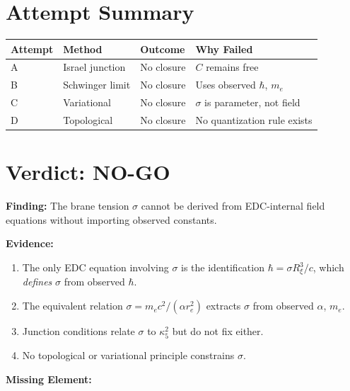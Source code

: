 \documentclass[11pt,a4paper]{article}
\begin{document}
\section{Attempt Summary}

\begin{center}
\begin{tabular}{llll}
\toprule
\textbf{Attempt} & \textbf{Method} & \textbf{Outcome} & \textbf{Why Failed} \\
\midrule
A & Israel junction & No closure & $C$ remains free \\
B & Schwinger limit & No closure & Uses observed $\hbar$, $m_e$ \\
C & Variational & No closure & $\sigma$ is parameter, not field \\
D & Topological & No closure & No quantization rule exists \\
\bottomrule
\end{tabular}
\end{center}

\section{Verdict: NO-GO}

\begin{nogbox}[Outcome: NO-GO]
\textbf{Finding:} The brane tension $\sigma$ cannot be derived from
EDC-internal field equations without importing observed constants.

\textbf{Evidence:}
\begin{enumerate}
\item The only EDC equation involving $\sigma$ is the identification
$\hbar = \sigma R_\xi^3/c$, which \textit{defines} $\sigma$ from observed $\hbar$.

\item The equivalent relation $\sigma = m_e c^2/(\alpha r_e^2)$ extracts
$\sigma$ from observed $\alpha$, $m_e$.

\item Junction conditions relate $\sigma$ to $\kappa_5^2$ but do not fix either.

\item No topological or variational principle constrains $\sigma$.
\end{enumerate}

\textbf{Missing Element:}
\begin{center}
\end{center}
\end{nogbox}
\end{document}
